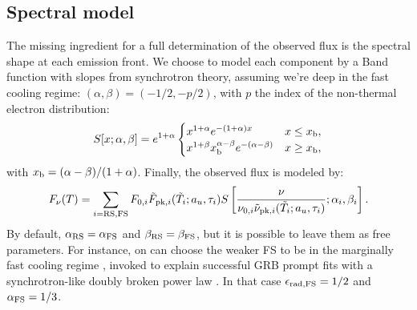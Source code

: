 \documentclass{article}
\newcommand{\pk}{{\rm pk}}
\newcommand{\RS}{{\rm RS}}
\newcommand{\FS}{{\rm FS}}
\begin{document}
\subsection{Spectral model}
The missing ingredient for a full determination of the observed flux is the spectral shape at each emission front. We choose to model each component by a Band function with slopes from synchrotron theory, assuming we're deep in the fast cooling regime: $(\alpha, \beta)=(-1/2, -p/2)$, with $p$ the index of the non-thermal electron distribution:
\begin{equation}
S[x;\alpha,\beta] = e^{1+\alpha}\begin{cases}
    x^{1+\alpha}e^{-(1+\alpha)x} &x\leq x_{\rm b},\\
    x^{1+\beta}x_{\rm b}^{\alpha-\beta}e^{-(\alpha-\beta)} &x\geq x_{\rm b},
\end{cases}
\end{equation}
with $x_{\rm b}=(\alpha-\beta)/(1+\alpha)$. Finally, the observed flux is modeled by:
\begin{equation}
F_\nu(T) = \sum_{i=\RS,\FS} F_{0,i} \tilde{F}_{\pk,i}(\tilde{T}_i;a_u,\tau_i) S\left[\frac{\nu}{\nu_{0,i}\tilde{\nu}_{\pk,i}(\tilde{T}_i;a_u,\tau_i)};\alpha_i,\beta_i\right].
\end{equation}
By default, $\alpha_\RS=\alpha_\FS$ and $\beta_\RS=\beta_\FS$, but it is possible to leave them as free parameters. For instance, on can choose the weaker FS to be in the marginally fast cooling regime \citep[see e.g.][]{beniamini2018marginally}, invoked to explain successful GRB prompt fits with a synchrotron-like doubly broken power law \citep[e.g.][]{ravasio2019evidence}. In that case $\epsilon_{\rm rad,\FS}=1/2$ and $\alpha_\FS=1/3$.
\end{document}

